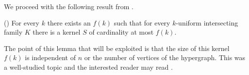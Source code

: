 We proceed with the following result from \cite{OriginalKernel}.
%
\begin{lemma}\label{lem:OriginalKernel}
(\cite{OriginalKernel}) For every $k$ there exists an $f(k)$ such that for every $k$-uniform intersecting family $K$ there is a kernel $S$ of cardinality at most $f(k)$.
\end{lemma}
%
The point of this lemma that will be exploited is that the size of this kernel $f(k)$ is independent of $n$ or the number of vertices of the hypergraph. This was a well-studied topic and the interested reader may read \cite{Kernel1,Kernel2,Kernel3,Kernel5,Kernel6,Kernel4}.
%
%
%
